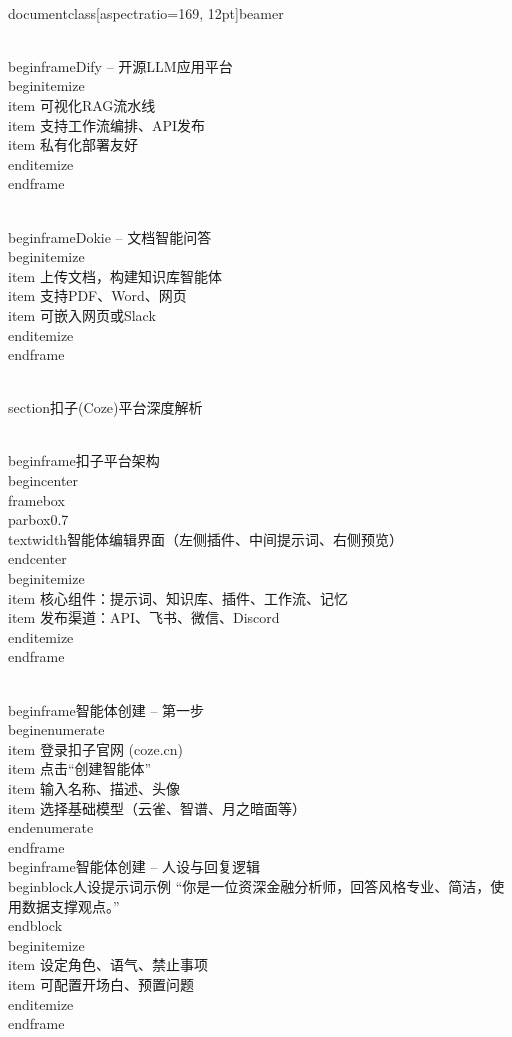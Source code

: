 \\documentclass[aspectratio=169, 12pt]{beamer}
\begin{document}
\\begin{frame}{Dify – 开源LLM应用平台}
\\begin{itemize}
    \\item 可视化RAG流水线
    \\item 支持工作流编排、API发布
    \\item 私有化部署友好
\\end{itemize}
\\end{frame}

\\begin{frame}{Dokie – 文档智能问答}
\\begin{itemize}
    \\item 上传文档，构建知识库智能体
    \\item 支持PDF、Word、网页
    \\item 可嵌入网页或Slack
\\end{itemize}
\\end{frame}

\\section{扣子(Coze)平台深度解析}

\\begin{frame}{扣子平台架构}
\\begin{center}
\\framebox{\\parbox{0.7\\textwidth}{智能体编辑界面（左侧插件、中间提示词、右侧预览）}}
\\end{center}
\\begin{itemize}
    \\item 核心组件：提示词、知识库、插件、工作流、记忆
    \\item 发布渠道：API、飞书、微信、Discord
\\end{itemize}
\\end{frame}

\\begin{frame}{智能体创建 – 第一步}
\\begin{enumerate}
    \\item 登录扣子官网 (coze.cn)
    \\item 点击“创建智能体”
    \\item 输入名称、描述、头像
    \\item 选择基础模型（云雀、智谱、月之暗面等）
\\end{enumerate}
\\end{frame}
\\begin{frame}{智能体创建 – 人设与回复逻辑}
\\begin{block}{人设提示词示例}
“你是一位资深金融分析师，回答风格专业、简洁，使用数据支撑观点。”
\\end{block}
\\begin{itemize}
    \\item 设定角色、语气、禁止事项
    \\item 可配置开场白、预置问题
\\end{itemize}
\\end{frame}
\end{document}
